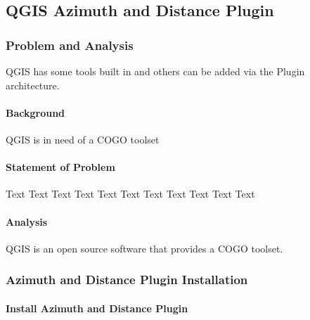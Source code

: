 %
%
%

\subsection{QGIS Azimuth and Distance Plugin}
\subsubsection{Problem and Analysis}
QGIS has some tools built in and others can be added via the Plugin architecture.
\begin{adjmulticols}{2}{\innerMar}{\outerMar}
\paragraph{Background}
\noindent QGIS is in need of a COGO toolset
\paragraph{Statement of Problem}
\noindent Text Text Text Text Text Text Text Text Text Text Text
\paragraph{Analysis}
\noindent QGIS is an open source software that provides a COGO toolset.
\end{adjmulticols}
\clearpage
\subsubsection{Azimuth and Distance Plugin Installation}

\paragraph*{Install Azimuth and Distance Plugin}

